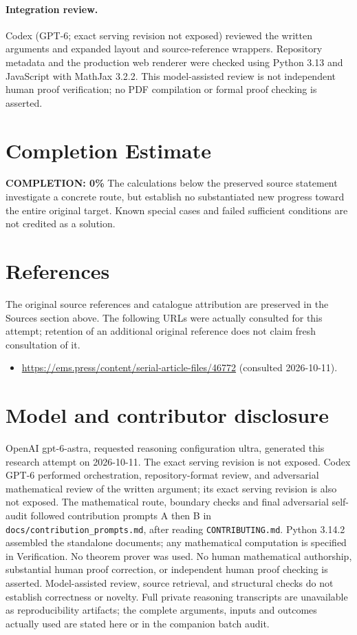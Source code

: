 \documentclass[11pt]{article}
\begin{document}
\paragraph{Integration review.} Codex (GPT-6; exact serving revision not exposed) reviewed the written arguments and expanded layout and source-reference wrappers. Repository metadata and the production web renderer were checked using Python 3.13 and JavaScript with MathJax 3.2.2. This model-assisted review is not independent human proof verification; no PDF compilation or formal proof checking is asserted.

\section{Completion Estimate}
\noindent\textbf{COMPLETION: 0\%}
The calculations below the preserved source statement investigate a concrete route,
but establish no substantiated new progress toward the entire original target.
Known special cases and failed sufficient conditions are not credited as a solution.
\section{References}
The original source references and catalogue attribution are preserved in the
Sources section above. The following URLs were actually consulted for this attempt;
retention of an additional original reference does not claim fresh consultation of it.
\begin{itemize}
\item \url{https://ems.press/content/serial-article-files/46772} (consulted 2026-10-11). 
\end{itemize}
\section{Model and contributor disclosure}
OpenAI gpt-6-astra, requested reasoning configuration ultra, generated this research
attempt on 2026-10-11. The exact serving revision is not exposed. Codex GPT-6
performed orchestration, repository-format review, and adversarial mathematical review of the written argument; its exact serving revision
is also not exposed. The mathematical route, boundary checks and final adversarial
self-audit followed contribution prompts A then B in
\texttt{docs/contribution\_prompts.md}, after reading \texttt{CONTRIBUTING.md}.
Python 3.14.2 assembled the standalone documents; any mathematical computation is
specified in Verification. No theorem prover was used. No human mathematical
authorship, substantial human proof correction, or independent human proof checking
is asserted. Model-assisted review, source retrieval, and structural checks do not
establish correctness or novelty. Full private reasoning transcripts are unavailable
as reproducibility artifacts; the complete arguments, inputs and outcomes actually
used are stated here or in the companion batch audit.
\end{document}
